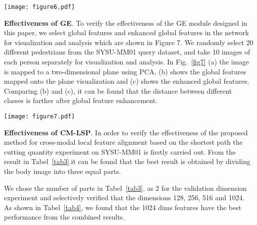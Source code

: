 \documentclass[journal]{IEEEtran}
\begin{document}
\begin{figure*}[!t]
	\centering
	\texttt{[image: figure6.pdf]}
	\caption{(a) Impacts of Backbone in terms of Rank-1,(b) Impacts of Backbone in terms of mAP, (c) Impacts of Backbone in terms of mINP}
	\label{fig6}
\end{figure*}
\textbf{Effectiveness of GE}.
To verify the effectiveness of the GE module designed in this paper, we select global features and enhanced global features in the network for visualization and analysis which are shown in Figure 7. We randomly select 20 different pedestrians from the SYSU-MM01 query dataset, and take 10 images of each person separately for visualization and analysis. In Fig.~\ref{fig7} (a) the image is mapped to a two-dimensional plane using PCA, (b) shows the global features mapped onto the plane visualization and (c) shows the enhanced global features. Comparing (b) and (c), it can be found that the distance between different classes is farther after global feature enhancement. 
\begin{figure*}[!t]
	\centering
	\texttt{[image: figure7.pdf]}
	\caption{(a) Impacts of Backbone in terms of Rank-1,(b) Impacts of Backbone in terms of mAP, (c) Impacts of Backbone in terms of mINP}
	\label{fig7}
\end{figure*}

\textbf{Effectiveness of CM-LSP}.
In order to verify the effectiveness of the proposed method for cross-modal local feature alignment based on the shortest path the cutting quantity experiment on SYSU-MM01 is firstly carried out. From the result in Tabel~\ref{tab3}.it can be found that the best result is obtained by dividing the body image into three equal parts.

We chose the number of parts in Tabel~\ref{tab3}. as 2 for the validation dimension experiment and selectively verified that the dimensions 128, 256, 516 and 1024. As shown in Tabel~\ref{tab4}, we found that the 1024 dims features have the best performance from the combined results.
\end{document}
